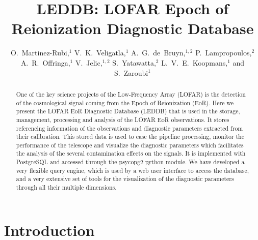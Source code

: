 
\resetcounters


\title{LEDDB: LOFAR Epoch of Reionization Diagnostic Database}
\author{O.~Martinez-Rubi,$^1$ V.~K.~Veligatla,$^1$ A.~G.~de~Bruyn,$^{1,2}$ P.~Lampropoulos,$^2$ A.~R.~Offringa,$^1$ V.~Jelic,$^{1,2}$ S.~Yatawatta,$^2$ L.~V.~E.~Koopmans,$^1$ and S.~Zaroubi$^1$
}


\begin{abstract}
One of the key science projects of the Low-Frequency Array (LOFAR) is the detection of the cosmological signal coming from the Epoch of Reionization (EoR). Here we present the LOFAR EoR Diagnostic Database (LEDDB) that is used in the storage, management, processing and analysis of the LOFAR EoR observations. It stores referencing information of the observations and diagnostic parameters extracted from their calibration. This stored data is used to ease the pipeline processing, monitor the performance of the telescope and visualize the diagnostic parameters which facilitates the analysis of the several contamination effects on the signals. It is implemented with PostgreSQL and accessed through the psycopg2 python module. We have developed a very flexible query engine, which is used by a web user interface to access the database, and a very extensive set of tools for the visualization of the diagnostic parameters through all their multiple dimensions.
\end{abstract}

\section{Introduction}

